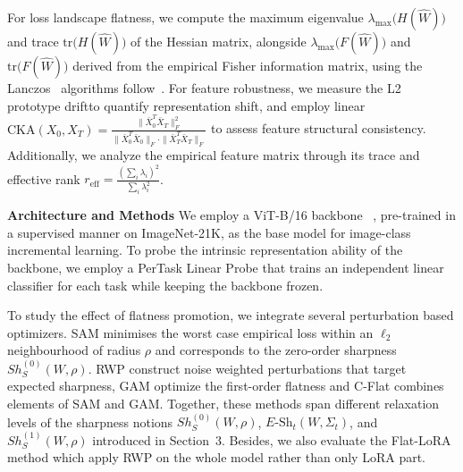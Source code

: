 \documentclass[10pt]{article} %
\begin{document}
For loss landscape flatness, we compute the maximum eigenvalue $\lambda_{\max}\big(H(\hat{W})\big)$ and trace $\mathrm{tr}\big(H(\hat{W})\big)$ of the Hessian matrix, alongside $\lambda_{\max}\big(F(\hat{W})\big)$ and $\mathrm{tr}\big(F(\hat{W})\big)$ derived from the empirical Fisher information matrix, using the Lanczos~\citep{ghorbaniInvestigationNeuralNet2019} algorithms follow~\citep{foretSharpnessAwareMinimizationEfficiently2021}. For feature robustness, we measure {the L2 prototype drift}to quantify representation shift, and employ linear $\text{CKA}(X_0, X_T) = \frac{\| \bar{X}_0^T \bar{X}_T \|_F^2}{\| \bar{X}_0^T \bar{X}_0 \|_F \cdot \| \bar{X}_T^T \bar{X}_T \|_F}$ to assess feature structural consistency. Additionally, we analyze the empirical feature matrix through its trace and effective rank $r_{\text{eff}} = \frac{(\sum_i \lambda_i)^2}{\sum_i \lambda_i^2}$.




\textbf{Architecture and Methods}  
We employ a ViT-B/16 backbone ~\cite{dosovitskiy2020image}, pre-trained in a supervised manner on ImageNet-21K, as the base model for image-class incremental learning. 
To probe the intrinsic representation ability of the backbone, we employ a PerTask Linear Probe that trains an independent linear classifier for each task while keeping the backbone frozen. 




To study the effect of flatness promotion, we integrate several perturbation based optimizers. SAM minimises the worst case empirical loss within an $\ell_2$ neighbourhood of radius $\rho$ and corresponds to the zero-order sharpness $Sh^{(0)}_S(W,\rho)$. RWP construct noise weighted perturbations that target expected sharpness, GAM optimize the first-order flatness and C-Flat combines elements of SAM and GAM. Together, these methods span different relaxation levels of the sharpness notions $Sh^{(0)}_S(W,\rho)$, $E\text{-Sh}_t(W,\Sigma_t)$, and $Sh^{(1)}_S(W,\rho)$ introduced in Section~3. Besides, we also evaluate the Flat-LoRA method which apply RWP on the whole model rather than only LoRA part.
\end{document}
